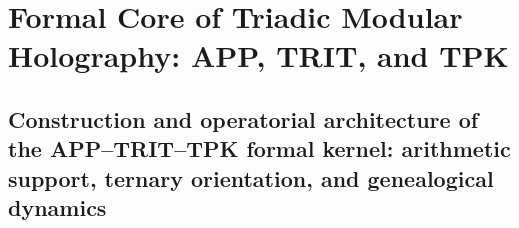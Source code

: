 %




\part{Formal Core of Triadic Modular Holography: APP, TRIT, and TPK}

\chapter{Construction and operatorial architecture of the APP–TRIT–TPK formal kernel: arithmetic support, ternary orientation, and genealogical dynamics}
\label{chap:sucesor-102-01}







